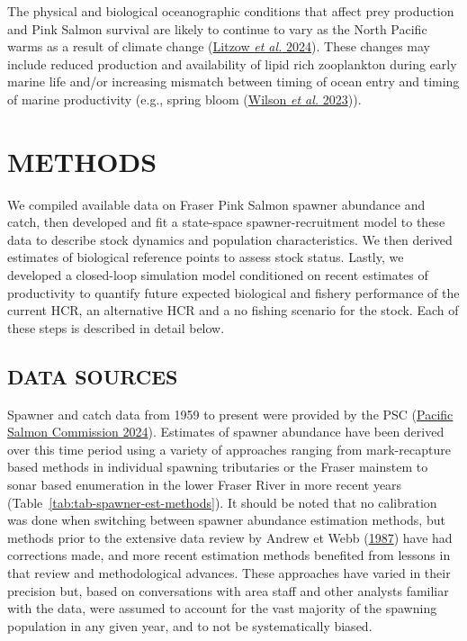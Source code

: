 \documentclass[french,11pt]{book}
\begin{document}
The physical and biological oceanographic conditions that affect prey production and Pink Salmon survival are likely to continue to vary as the North Pacific warms as a result of climate change (\protect\hyperlink{ref-litzowClimateAttributionTime2024}{Litzow \emph{et al.} 2024}). These changes may include reduced production and availability of lipid rich zooplankton during early marine life and/or increasing mismatch between timing of ocean entry and timing of marine productivity (e.g., spring bloom (\protect\hyperlink{ref-wilsonPhenologicalShiftsMismatch2023}{Wilson \emph{et al.} 2023})).

\hypertarget{methods}{%
\section{METHODS}\label{methods}}

We compiled available data on Fraser Pink Salmon spawner abundance and catch, then developed and fit a state-space spawner-recruitment model to these data to describe stock dynamics and population characteristics. We then derived estimates of biological reference points to assess stock status. Lastly, we developed a closed-loop simulation model conditioned on recent estimates of productivity to quantify future expected biological and fishery performance of the current HCR, an alternative HCR and a no fishing scenario for the stock. Each of these steps is described in detail below.

\hypertarget{data-sources}{%
\subsection{DATA SOURCES}\label{data-sources}}

Spawner and catch data from 1959 to present were provided by the PSC (\protect\hyperlink{ref-pacificsalmoncommissionFraserRiverPanel2024}{Pacific Salmon Commission 2024}). Estimates of spawner abundance have been derived over this time period using a variety of approaches ranging from mark-recapture based methods in individual spawning tributaries or the Fraser mainstem to sonar based enumeration in the lower Fraser River in more recent years (Table~\ref{tab:tab-spawner-est-methods}). It should be noted that no calibration was done when switching between spawner abundance estimation methods, but methods prior to the extensive data review by Andrew et Webb (\protect\hyperlink{ref-andrewReviewAssessmentAdult1987}{1987}) have had corrections made, and more recent estimation methods benefited from lessons in that review and methodological advances. These approaches have varied in their precision but, based on conversations with area staff and other analysts familiar with the data, were assumed to account for the vast majority of the spawning population in any given year, and to not be systematically biased.
\end{document}
